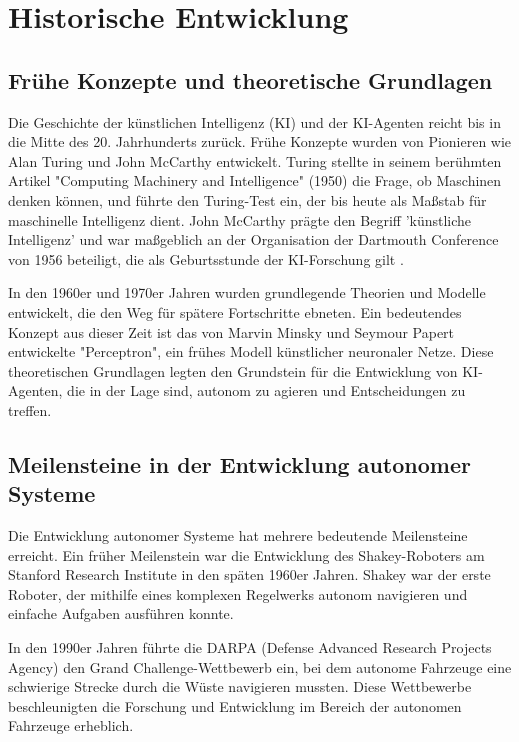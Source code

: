 \documentclass[conference]{IEEEtran}
\begin{document}
\section{Historische Entwicklung}
\subsection{Frühe Konzepte und theoretische Grundlagen}
Die Geschichte der künstlichen Intelligenz (KI) und der KI-Agenten reicht bis in die Mitte des 20. Jahrhunderts zurück. Frühe Konzepte wurden von Pionieren wie Alan Turing und John McCarthy entwickelt. Turing stellte in seinem berühmten Artikel "Computing Machinery and Intelligence" (1950) die Frage, ob Maschinen denken können, und führte den Turing-Test ein, der bis heute als Maßstab für maschinelle Intelligenz dient. John McCarthy prägte den Begriff 'künstliche Intelligenz' und war maßgeblich an der Organisation der Dartmouth Conference von 1956 beteiligt, die als Geburtsstunde der KI-Forschung gilt \cite{moto-oka_overview_1983}.
\cite{dagher_evolution_2023}

In den 1960er und 1970er Jahren wurden grundlegende Theorien und Modelle entwickelt, die den Weg für spätere Fortschritte ebneten. Ein bedeutendes Konzept aus dieser Zeit ist das von Marvin Minsky und Seymour Papert entwickelte "Perceptron", ein frühes Modell künstlicher neuronaler Netze. Diese theoretischen Grundlagen legten den Grundstein für die Entwicklung von KI-Agenten, die in der Lage sind, autonom zu agieren und Entscheidungen zu treffen\cite{leusin_evolutionary_2021}.

\subsection{Meilensteine in der Entwicklung autonomer Systeme}
Die Entwicklung autonomer Systeme hat mehrere bedeutende Meilensteine erreicht. Ein früher Meilenstein war die Entwicklung des Shakey-Roboters am Stanford Research Institute in den späten 1960er Jahren. Shakey war der erste Roboter, der mithilfe eines komplexen Regelwerks autonom navigieren und einfache Aufgaben ausführen konnte\cite{moto-oka_overview_1983}.

In den 1990er Jahren führte die DARPA (Defense Advanced Research Projects Agency) den Grand Challenge-Wettbewerb ein, bei dem autonome Fahrzeuge eine schwierige Strecke durch die Wüste navigieren mussten. Diese Wettbewerbe beschleunigten die Forschung und Entwicklung im Bereich der autonomen Fahrzeuge erheblich\cite{moto-oka_overview_1983}.
\end{document}

